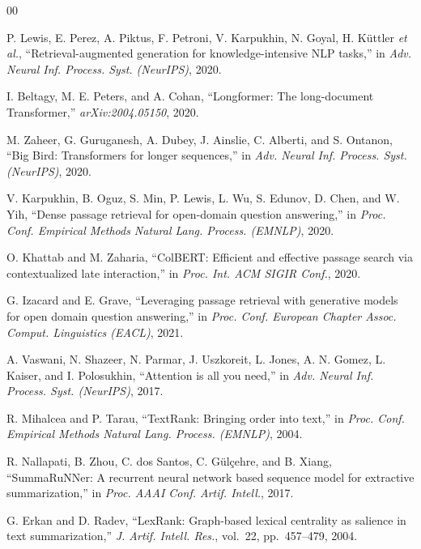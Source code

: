 \documentclass[conference]{IEEEtran}
\begin{document}
\begin{thebibliography}{00}

P. Lewis, E. Perez, A. Piktus, F. Petroni, V. Karpukhin,
N. Goyal, H. K\"{u}ttler \textit{et al.},
``Retrieval-augmented generation for knowledge-intensive NLP
tasks,'' in \textit{Adv. Neural Inf. Process. Syst. (NeurIPS)},
2020.

I. Beltagy, M. E. Peters, and A. Cohan, ``Longformer: The
long-document Transformer,'' \textit{arXiv:2004.05150}, 2020.

M. Zaheer, G. Guruganesh, A. Dubey, J. Ainslie, C. Alberti,
and S. Ontanon, ``Big Bird: Transformers for longer
sequences,'' in \textit{Adv. Neural Inf. Process. Syst.
(NeurIPS)}, 2020.

V. Karpukhin, B. Oguz, S. Min, P. Lewis, L. Wu, S. Edunov,
D. Chen, and W. Yih, ``Dense passage retrieval for open-domain
question answering,'' in \textit{Proc. Conf. Empirical Methods
Natural Lang. Process. (EMNLP)}, 2020.

O. Khattab and M. Zaharia, ``ColBERT: Efficient and effective
passage search via contextualized late interaction,'' in
\textit{Proc. Int. ACM SIGIR Conf.}, 2020.

G. Izacard and E. Grave, ``Leveraging passage retrieval with
generative models for open domain question answering,'' in
\textit{Proc. Conf. European Chapter Assoc. Comput. Linguistics
(EACL)}, 2021.

A. Vaswani, N. Shazeer, N. Parmar, J. Uszkoreit, L. Jones,
A. N. Gomez, L. Kaiser, and I. Polosukhin, ``Attention is all
you need,'' in \textit{Adv. Neural Inf. Process. Syst.
(NeurIPS)}, 2017.

R. Mihalcea and P. Tarau, ``TextRank: Bringing order into
text,'' in \textit{Proc. Conf. Empirical Methods Natural Lang.
Process. (EMNLP)}, 2004.

R. Nallapati, B. Zhou, C. dos Santos, C. G\"{u}l\c{c}ehre,
and B. Xiang, ``SummaRuNNer: A recurrent neural network based
sequence model for extractive summarization,'' in
\textit{Proc. AAAI Conf. Artif. Intell.}, 2017.

G. Erkan and D. Radev, ``LexRank: Graph-based lexical centrality
as salience in text summarization,''
\textit{J. Artif. Intell. Res.}, vol.~22, pp.~457--479, 2004.


\end{thebibliography}
\end{document}
